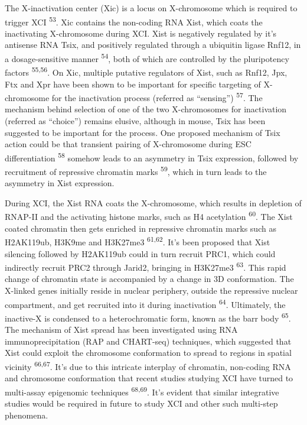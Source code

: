 \documentclass[11pt,twoside]{MPIthesis}
\theoremstyle{definition}
\theoremstyle{definition}
\theoremstyle{definition}
\theoremstyle{remark}
\begin{document}
The X-inactivation center (Xic) is a locus on X-chromosome which is
required to trigger XCI \textsuperscript{53}. Xic contains the
non-coding RNA Xist, which coats the inactivating X-chromosome during
XCI. Xist is negatively regulated by it's antisense RNA Tsix, and
positively regulated through a ubiquitin ligase Rnf12, in a
dosage-sensitive manner \textsuperscript{54}, both of which are
controlled by the pluripotency factors \textsuperscript{55,56}. On Xic,
multiple putative regulators of Xist, such as Rnf12, Jpx, Ftx and Xpr
have been shown to be important for specific targeting of X-chromosome
for the inactivation process (referred as ``sensing'')
\textsuperscript{57}. The mechanism behind selection of one of the two
X-chromosomes for inactivation (referred as ``choice'') remains elusive,
although in mouse, Tsix has been suggested to be important for the
process. One proposed mechanism of Tsix action could be that transient
pairing of X-chromosome during ESC differentiation \textsuperscript{58}
somehow leads to an asymmetry in Tsix expression, followed by
recruitment of repressive chromatin marks \textsuperscript{59}, which in
turn leads to the asymmetry in Xist expression.

During XCI, the Xist RNA coats the X-chromosome, which results in
depletion of RNAP-II and the activating histone marks, such as H4
acetylation \textsuperscript{60}. The Xist coated chromatin then gets
enriched in repressive chromatin marks such as H2AK119ub, H3K9me and
H3K27me3 \textsuperscript{61,62}. It's been proposed that Xist silencing
followed by H2AK119ub could in turn recruit PRC1, which could indirectly
recruit PRC2 through Jarid2, bringing in H3K27me3 \textsuperscript{63}.
This rapid change of chromatin state is accompanied by a change in 3D
conformation. The X-linked genes initially reside in nuclear periphery,
outside the repressive nuclear compartment, and get recruited into it
during inactivation \textsuperscript{64}. Ultimately, the inactive-X is
condensed to a heterochromatic form, known as the barr body
\textsuperscript{65}. The mechanism of Xist spread has been investigated
using RNA immunoprecipitation (RAP and CHART-seq) techniques, which
suggested that Xist could exploit the chromosome conformation to spread
to regions in spatial vicinity \textsuperscript{66,67}. It's due to this
intricate interplay of chromatin, non-coding RNA and chromosome
conformation that recent studies studying XCI have turned to multi-assay
epigenomic techniques \textsuperscript{68,69}. It's evident that similar
integrative studies would be required in future to study XCI and other
such multi-step phenomena.
\end{document}
